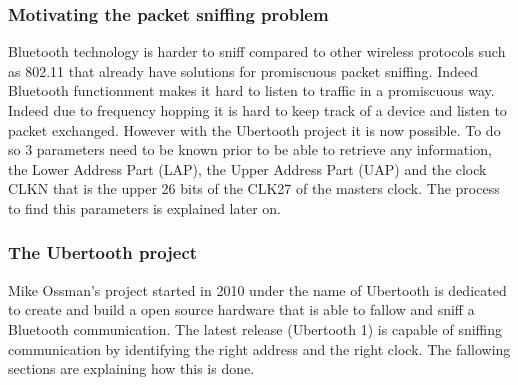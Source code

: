\subsubsection{Motivating the packet sniffing problem}
Bluetooth technology is harder to sniff compared to other wireless protocols such as 802.11 that already have solutions for promiscuous packet sniffing. Indeed Bluetooth functionment makes it hard to listen to traffic in a promiscuous way.
Indeed due to frequency hopping it is hard to keep track of a device and listen to packet exchanged. However with the Ubertooth project it is now possible. To do so 3 parameters need to be known prior to be able to retrieve any information, the Lower Address Part (LAP), the Upper Address Part (UAP) and the clock CLKN that is the upper 26 bits of the CLK27 of the masters clock. The process to find this parameters is explained later on.

\subsubsection{The Ubertooth project}

Mike Ossman's project  started in 2010 under the name of Ubertooth is dedicated to create and build a open source hardware that is able to fallow and sniff a Bluetooth communication. The latest release (Ubertooth 1) is capable of sniffing communication by identifying the right address and the right clock. The fallowing sections are explaining how this is done.

